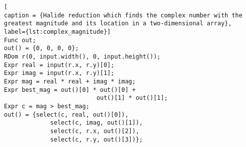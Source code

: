 \begin{lstlisting}[
caption = {Halide reduction which finds the complex number with the greatest magnitude and its location in a two-dimensional array}, label={lst:complex_magnitude}]
Func out;
out() = {0, 0, 0, 0};
RDom r(0, input.width(), 0, input.height());
Expr real = input(r.x, r.y)[0];
Expr imag = input(r.x, r.y)[1];
Expr mag = real * real + imag * imag;
Expr best_mag = out()[0] * out()[0] +
                          out()[1] * out()[1];
Expr c = mag > best_mag;
out() = {select(c, real, out()[0]),
             select(c, imag, out()[1]),
             select(c, r.x, out()[2]),
             select(c, r.y, out()[3])};
\end{lstlisting}
